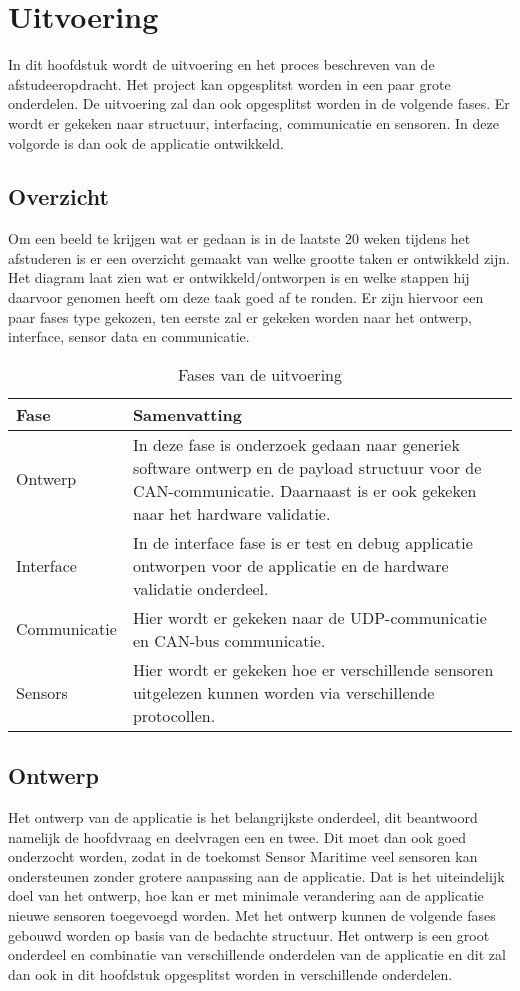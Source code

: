 \chapter{Uitvoering}
In dit hoofdstuk wordt de uitvoering en het proces beschreven van de afstudeeropdracht. Het project kan opgesplitst worden in een paar grote onderdelen. De uitvoering zal dan ook opgesplitst worden in de volgende fases. Er wordt er gekeken naar structuur, interfacing, communicatie en sensoren. In deze volgorde is dan ook de applicatie ontwikkeld.

\section{Overzicht}
Om een beeld te krijgen wat er gedaan is in de laatste 20 weken tijdens het afstuderen is er een overzicht gemaakt van welke grootte taken er ontwikkeld zijn. Het diagram laat zien wat er ontwikkeld/ontworpen is en welke stappen hij daarvoor genomen heeft om deze taak goed af te ronden. Er zijn hiervoor een paar fases type gekozen, ten eerste zal er gekeken worden naar het ontwerp, interface, sensor data en communicatie.

\begin{table}[h!]
	\centering
	\caption{Fases van de uitvoering}
	\label{tab:UitvoeringOverzicht}
	\begin{tabular}{lp{13cm}}
	\toprule
	\textbf{Fase} & \textbf{Samenvatting} \\ \midrule
	Ontwerp 				& In deze fase is onderzoek gedaan naar generiek software ontwerp en de payload structuur voor de CAN-communicatie. Daarnaast is er ook gekeken naar het hardware validatie. \\
	Interface 				& In de interface fase is er test en debug applicatie ontworpen voor de applicatie en de hardware validatie onderdeel. 	\\
	Communicatie 			& Hier wordt er gekeken naar de UDP-communicatie en CAN-bus communicatie.												\\
	Sensors  				& Hier wordt er gekeken hoe er verschillende sensoren uitgelezen kunnen worden via verschillende protocollen.			\\ \bottomrule
	\end{tabular}
\end{table}

\newpage
\section{Ontwerp}
Het ontwerp van de applicatie is het belangrijkste onderdeel, dit beantwoord namelijk de hoofdvraag en deelvragen een en twee. Dit moet dan ook goed onderzocht worden, zodat in de toekomst Sensor Maritime veel sensoren kan ondersteunen zonder grotere aanpassing aan de applicatie. Dat is het uiteindelijk doel van het ontwerp, hoe kan er met minimale verandering aan de applicatie nieuwe sensoren toegevoegd worden. Met het ontwerp kunnen de volgende fases gebouwd worden op basis van de bedachte structuur. Het ontwerp is een groot onderdeel en combinatie van verschillende onderdelen van de applicatie en dit zal dan ook in dit hoofdstuk opgesplitst worden in verschillende onderdelen.

